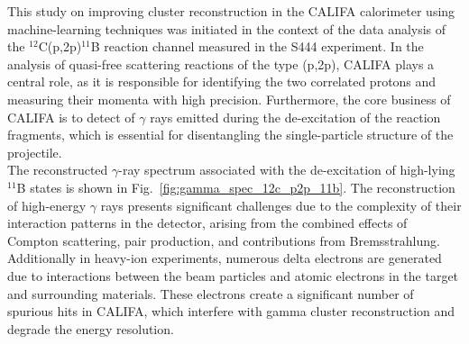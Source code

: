 This study on improving cluster reconstruction in the CALIFA calorimeter using machine-learning techniques was initiated in the context of the data analysis of the $^{12}$C(p,2p)$^{11}$B reaction channel measured in the S444 experiment. In the analysis of quasi-free scattering reactions of the type (p,2p), CALIFA plays a central role, as it is responsible for identifying the two correlated protons and measuring their momenta with high precision. Furthermore, the core business of CALIFA is to detect of $\gamma$ rays emitted during the de-excitation of the reaction fragments, which is essential for disentangling the single-particle structure of the projectile.\\
The reconstructed $\gamma$-ray spectrum associated with the de-excitation of high-lying $^{11}$B states is shown in Fig.~\ref{fig:gamma_spec_12c_p2p_11b}. The reconstruction of high-energy $\gamma$ rays presents significant challenges due to the complexity of their interaction patterns in the detector, arising from the combined effects of Compton scattering, pair production, and contributions from Bremsstrahlung.\\
Additionally in heavy-ion experiments, numerous delta electrons are generated due to interactions between the beam particles and atomic electrons in the target and surrounding materials. These electrons create a significant number of spurious hits in CALIFA, which interfere with gamma cluster reconstruction and degrade the energy resolution.\\
